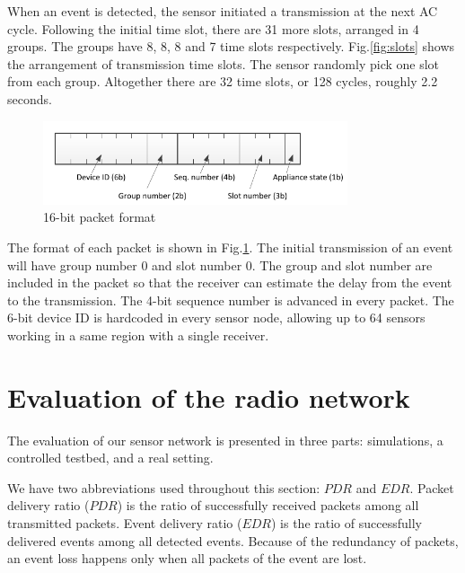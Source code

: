 When an event is detected, the sensor initiated a transmission at the next AC cycle. Following the initial time slot, there are 31 more slots, arranged in 4 groups. The groups have 8, 8, 8 and 7 time slots respectively. Fig.\ref{fig:slots} shows the arrangement of transmission time slots. The sensor randomly pick one slot from each group. Altogether there are 32 time slots, or 128 cycles, roughly 2.2 seconds. 

\begin{figure}[htb]
  \centering
  \includegraphics[width=0.8\textwidth]{figures/packet}
  \caption{16-bit packet format}
  \label{fig:packet}
\end{figure}

The format of each packet is shown in Fig.\ref{fig:packet}. The initial transmission of an event will have group number 0 and slot number 0. The group and slot number are included in the packet so that the receiver can estimate the delay from the event to the transmission. The 4-bit sequence number is advanced in every packet. The 6-bit device ID is hardcoded in every sensor node, allowing up to 64 sensors working in a same region with a single receiver. 

\section{Evaluation of the radio network}

The evaluation of our sensor network is presented in three parts: simulations, a controlled testbed, and a real setting. 

We have two abbreviations used throughout this section: $PDR$ and $EDR$. Packet delivery ratio ($PDR$) is the ratio of successfully received packets among all transmitted packets. Event delivery ratio ($EDR$) is the ratio of successfully delivered events among all detected events. Because of the redundancy of packets, an event loss happens only when all packets of the event are lost. 


